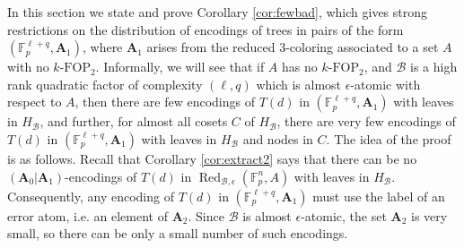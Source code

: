 \documentclass[12pt,oneside,british,a4wide]{amsart}
\numberwithin{equation}{section}
\theoremstyle{definition}
\def\F{\mathbb{F}}
\def\FOP{\mathrm{FOP}}
\def\e{\epsilon}
\newcommand{\calB}{\mathcal{B}}
\newcommand{\Red}{{\mathrm{Red}}}
\def\Red{\operatorname{Red}}
\begin{document}
In this section we state and prove Corollary \ref{cor:fewbad}, which gives strong restrictions on the distribution of encodings of trees in pairs of the form $(\F_p^{\ell+q}, \mathbf{A}_1)$, where $\mathbf{A}_1$ arises from the reduced $3$-coloring associated to a set $A$ with no $k$-$\FOP_2$.  Informally, we will see that if $A$ has no $k$-$\FOP_2$, and $\calB$ is a high rank quadratic factor of complexity $(\ell,q)$ which is almost $\e$-atomic with respect to $A$, then there are few encodings of $T(d)$ in $(\F_p^{\ell+q}, \mathbf{A}_1)$ with leaves in $H_{\calB}$, and further, for almost all cosets $C$ of $H_{\calB}$, there are very few encodings of $T(d)$ in $(\F_p^{\ell+q}, \mathbf{A}_1)$ with leaves in $H_{\calB}$ and nodes in $C$.  The idea of the proof is as follows. Recall that Corollary \ref{cor:extract2} says that there can be no $(\mathbf{A}_0|\mathbf{A}_1)$-encodings of $T(d)$ in $\Red_{\calB,\e}(\F_p^n,A)$ with leaves in $H_{\calB}$. Consequently, any encoding  of $T(d)$ in $(\F_p^{\ell+q}, \mathbf{A}_1)$  must use the label of an error atom, i.e. an element of $\mathbf{A}_2$.  Since $\calB$ is almost $\e$-atomic, the set $\mathbf{A}_2$ is very small, so there can be only a small number of such encodings.
\end{document}
